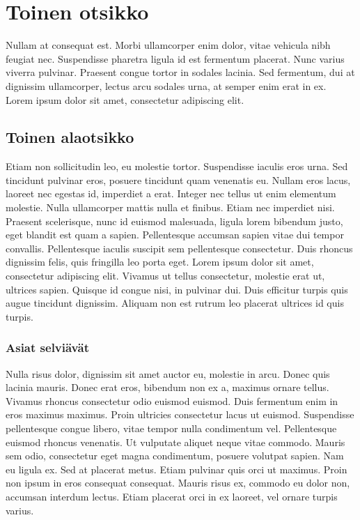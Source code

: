 \documentclass[12pt,a4paper,titlepage]{article}
\begin{document}
\section{Toinen otsikko}
Nullam at consequat est. Morbi ullamcorper enim dolor, vitae vehicula nibh feugiat nec. Suspendisse pharetra ligula id est fermentum placerat. Nunc varius viverra pulvinar. Praesent congue tortor in sodales lacinia. Sed fermentum, dui at dignissim ullamcorper, lectus arcu sodales urna, at semper enim erat in ex. Lorem ipsum dolor sit amet, consectetur adipiscing elit.

 \subsection{Toinen alaotsikko}
Etiam non sollicitudin leo, eu molestie tortor. Suspendisse iaculis eros urna. Sed tincidunt pulvinar eros, posuere tincidunt quam venenatis eu. Nullam eros lacus, laoreet nec egestas id, imperdiet a erat. Integer nec tellus ut enim elementum molestie. Nulla ullamcorper mattis nulla et finibus. Etiam nec imperdiet nisi. Praesent scelerisque, nunc id euismod malesuada, ligula lorem bibendum justo, eget blandit est quam a sapien. Pellentesque accumsan sapien vitae dui tempor convallis. Pellentesque iaculis suscipit sem pellentesque consectetur. Duis rhoncus dignissim felis, quis fringilla leo porta eget. Lorem ipsum dolor sit amet, consectetur adipiscing elit. Vivamus ut tellus consectetur, molestie erat ut, ultrices sapien. Quisque id congue nisi, in pulvinar dui. Duis efficitur turpis quis augue tincidunt dignissim. Aliquam non est rutrum leo placerat ultrices id quis turpis.

\subsubsection{Asiat selviävät}
Nulla risus dolor, dignissim sit amet auctor eu, molestie in arcu. Donec quis lacinia mauris. Donec erat eros, bibendum non ex a, maximus ornare tellus. Vivamus rhoncus consectetur odio euismod euismod. Duis fermentum enim in eros maximus maximus. Proin ultricies consectetur lacus ut euismod. Suspendisse pellentesque congue libero, vitae tempor nulla condimentum vel. Pellentesque euismod rhoncus venenatis. Ut vulputate aliquet neque vitae commodo. Mauris sem odio, consectetur eget magna condimentum, posuere volutpat sapien. Nam eu ligula ex. Sed at placerat metus. Etiam pulvinar quis orci ut maximus. Proin non ipsum in eros consequat consequat. Mauris risus ex, commodo eu dolor non, accumsan interdum lectus. Etiam placerat orci in ex laoreet, vel ornare turpis varius.
\end{document}
